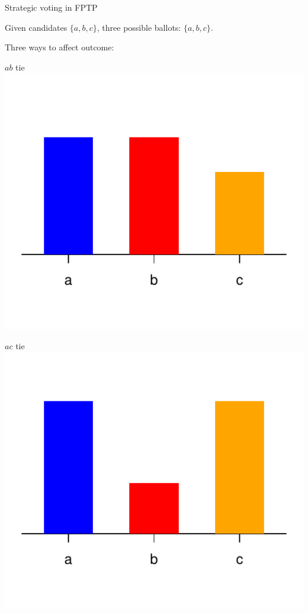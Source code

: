 \documentclass[10pt, en-GB]{beamer}
\begin{document}
\begin{frame}{Strategic voting in FPTP} 

Given candidates $\{a, b, c\}$, three possible ballots: $\{a, b, c\}$.\\ \bigskip \pause 

Three ways to affect outcome: \bigskip %

\begin{minipage}{.33\textwidth}
\centering $ab$ tie \\ 
\includegraphics[width=\textwidth]{pres_fig/cases_for_paper/plurality_ties_for_first_1.pdf}
\end{minipage}%
\begin{minipage}{.33\textwidth}
\centering $ac$ tie \\ 
\includegraphics[width=\textwidth]{pres_fig/cases_for_paper/plurality_ties_for_first_2.pdf}

\end{minipage}
\end{frame}
\end{document}
